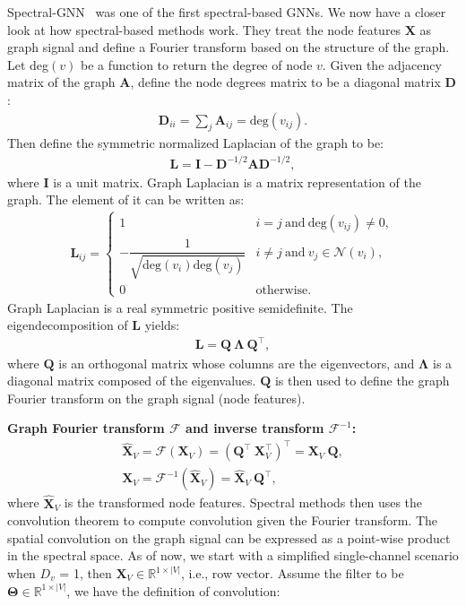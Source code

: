 Spectral-GNN~\cite{spectralgnn} was one of the first spectral-based GNNs. 
We now have a closer look at how spectral-based methods work. They treat the node features $\mathbf{X}$ as graph signal and define a Fourier transform based on the structure of the graph. Let deg$(v)$ be a function to return the degree of node $v$. Given the adjacency matrix of the graph $\mathbf{A}$, define the node degrees matrix to be a diagonal matrix $\mathbf{D}$:
\begin{gather}
\mathbf{D}_{ii} = \sum_j \mathbf{A}_{ij} = \text{deg}(v_{ij}). 
\end{gather}
Then define the symmetric normalized Laplacian of the graph to be:
\begin{gather}
\mathbf{L} = \mathbf{I} - \mathbf{D}^{-1/2}\mathbf{A}\mathbf{D}^{-1/2},
\end{gather}
where $\mathbf{I}$ is a unit matrix. Graph Laplacian is a matrix representation of the graph. The element of it can be written as:
\begin{gather}
\mathbf{L}_{ij} =
  \begin{cases}
   1 & i=j ~\text{and}~ \text{deg}(v_{ij}) \ne 0,\\
   -\dfrac{1}{\sqrt{\text{deg}(v_i) \text{deg}(v_j)}} & i \ne j ~\text{and}~ v_j \in \mathcal{N}(v_i),\\
   0 & \text{otherwise}.
  \end{cases}
\end{gather}
Graph Laplacian is a real symmetric positive semidefinite. The eigendecomposition of $\mathbf{L}$ yields:
\begin{gather}
\mathbf{L} = \mathbf{Q}~\mathbf{\Lambda}~\mathbf{Q}^\intercal,
\end{gather}
where $\mathbf{Q}$ is an orthogonal matrix whose columns are the eigenvectors, and $\mathbf{\Lambda}$ is a diagonal matrix composed of the eigenvalues. $\mathbf{Q}$ is then used to define the graph Fourier transform on the graph signal (node features).

\vspace{2mm}
\noindent \textbf{Graph Fourier transform $\mathcal{F}$ and inverse transform $\mathcal{F}^{-1}$:}
\begin{gather}
\hat {\mathbf{X}}_V = \mathcal{F}(\mathbf{X}_V) = (\mathbf{Q}^\intercal~\mathbf{X}_V^\intercal)^\intercal = \mathbf{X}_V~\mathbf{Q},\\
\mathbf{X}_V = \mathcal{F}^{-1}(\hat {\mathbf{X}}_V) = \hat {\mathbf{X}}_V~\mathbf{Q}^\intercal,
\end{gather}
where $\hat {\mathbf{X}}_V$ is the transformed node features. Spectral methods then uses the convolution theorem to compute convolution given the Fourier transform. The spatial convolution on the graph signal can be expressed as a point-wise product in the spectral space. As of now, we start with a simplified single-channel scenario when $D_v$ = 1, then $\mathbf{X}_V \in \mathbb{R}^{1 \times |V|}$, i.e., row vector. Assume the filter to be $\mathbf{\Theta} \in \mathbb{R}^{1 \times |V|}$, we have the definition of convolution:

